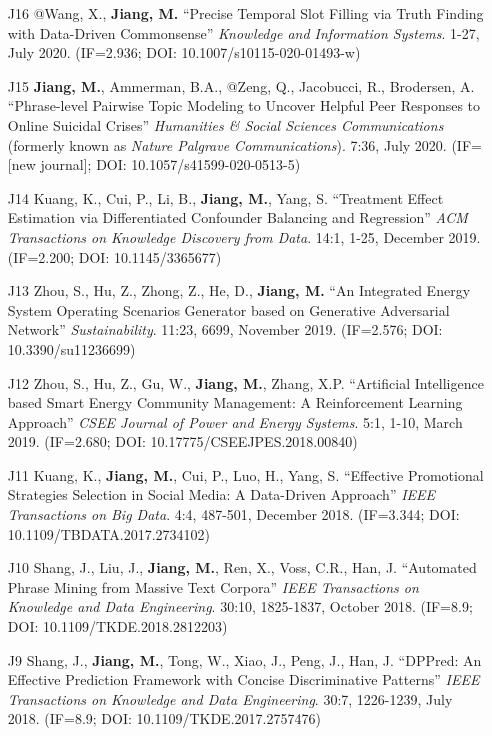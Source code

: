 \documentclass[10pt]{article}
\newenvironment{myindentpar}[1]%
{\begin{list}{}%
         {\setlength{\leftmargin}{#1}}%
         \item[]%
}
{\end{list}}
\newcounter{list}
\begin{document}
\begin{myindentpar}{0.00cm}
\begin{enumerate}[leftmargin=.5cm]
\item[J16] @Wang, X., \textbf{Jiang, M.} ``Precise Temporal Slot Filling via Truth Finding with Data-Driven Commonsense'' \textit{Knowledge and Information Systems}. 1-27, July 2020. (IF=2.936; DOI: 10.1007/s10115-020-01493-w)

\item[J15] \textbf{Jiang, M.}, Ammerman, B.A., @Zeng, Q., Jacobucci, R., Brodersen, A. ``Phrase-level Pairwise Topic Modeling to Uncover Helpful Peer Responses to Online Suicidal Crises'' \textit{Humanities \& Social Sciences Communications} (formerly known as \textit{Nature Palgrave Communications}). 7:36, July 2020. (IF=[new journal]; DOI: 10.1057/s41599-020-0513-5)

\item[J14] Kuang, K., Cui, P., Li, B., \textbf{Jiang, M.}, Yang, S. ``Treatment Effect Estimation via Differentiated Confounder Balancing and Regression'' \textit{ACM Transactions on Knowledge Discovery from Data}. 14:1, 1-25, December 2019. (IF=2.200; DOI: 10.1145/3365677)
	
\item[J13] Zhou, S., Hu, Z., Zhong, Z., He, D., \textbf{Jiang, M.} ``An Integrated Energy System Operating Scenarios Generator based on Generative Adversarial Network'' \textit{Sustainability}. 11:23, 6699, November 2019. (IF=2.576; DOI: 10.3390/su11236699)

\item[J12] Zhou, S., Hu, Z., Gu, W., \textbf{Jiang, M.}, Zhang, X.P. ``Artificial Intelligence based Smart Energy Community Management: A Reinforcement Learning Approach'' \textit{CSEE Journal of Power and Energy Systems}. 5:1, 1-10, March 2019. (IF=2.680; DOI: 10.17775/CSEEJPES.2018.00840)

\item[J11] Kuang, K., \textbf{Jiang, M.}, Cui, P., Luo, H., Yang, S. ``Effective Promotional Strategies Selection in Social Media: A Data-Driven Approach'' \textit{IEEE Transactions on Big Data}. 4:4, 487-501, December 2018. (IF=3.344; DOI: 10.1109/TBDATA.2017.2734102)

\item[J10] Shang, J., Liu, J., \textbf{Jiang, M.}, Ren, X., Voss, C.R., Han, J. ``Automated Phrase Mining from Massive Text Corpora'' \textit{IEEE Transactions on Knowledge and Data Engineering}. 30:10, 1825-1837, October 2018. (IF=8.9; DOI: 10.1109/TKDE.2018.2812203)

\item[J9] Shang, J., \textbf{Jiang, M.}, Tong, W., Xiao, J., Peng, J., Han, J. ``DPPred: An Effective Prediction Framework with Concise Discriminative Patterns'' \textit{IEEE Transactions on Knowledge and Data Engineering}. 30:7, 1226-1239, July 2018. (IF=8.9; DOI: 10.1109/TKDE.2017.2757476)


\end{enumerate}
\end{myindentpar}
\end{document}
